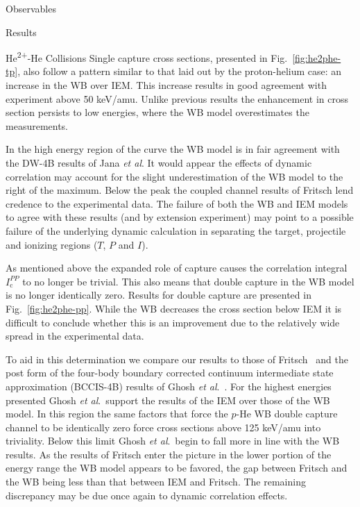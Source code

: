 \documentclass[letterpaper, 11 pt]{report}
\begin{document}
\begin{chapter}{Observables \label{chap:p-he2p-he}}
\begin{section}{Results \label{sec:phe2p-res}}
\begin{subsection}{\texorpdfstring{He\textsuperscript{2+}}{He2+}-He Collisions 
                         \label{sec:he2phe-res}}
         Single capture cross sections, presented in Fig.~\ref{fig:he2phe-tp}, also follow a pattern
         similar to that laid out by the proton-helium case: an increase in the WB over IEM. This
         increase results in good agreement with experiment above 50 keV/amu. Unlike previous results
         the enhancement in cross section persists to low energies, where the WB model overestimates the
          measurements.

         In the high energy region of the curve the WB model is in fair agreement with the DW-4B results
         of Jana \textit{et al}. It would appear the effects of dynamic correlation may account for the
         slight underestimation of the WB model to the right of the maximum. Below the peak the coupled
         channel results of Fritsch \cite{Fritsch-94} lend credence to the experimental data. The
         failure of both the WB and IEM models to agree with these results (and by extension experiment)
         may point to a possible failure of the underlying dynamic calculation in separating the target,
         projectile and ionizing regions ($T$, $P$ and $I$).

         As mentioned above the expanded role of capture causes the correlation integral
         $I^{PP}_\mathrm{c}$ to no longer be trivial. This also means that double capture in the WB
         model is no longer identically zero. Results for double capture are presented in
         Fig.~\ref{fig:he2phe-pp}. While the WB decreases the cross section below IEM it is difficult to
         conclude whether this is an improvement due to the relatively wide spread in the experimental
         data.

         To aid in this determination we compare our results to those of Fritsch~\cite{Fritsch-94} and
         the post form of the four-body boundary corrected continuum intermediate state approximation
         (BCCIS-4B) results of Ghosh \textit{et al}.~\cite{GDMP-08}. For the highest energies presented
         Ghosh \textit{et al}.\ support the results of the IEM over those of the WB model. In this
         region the same factors that force the $p$-He WB double capture channel to be identically zero
         force cross sections above 125 keV/amu into triviality. Below this limit Ghosh
         \textit{et al}.\ begin to fall more in line with the WB results. As the results of Fritsch
         enter the picture in the lower portion of the energy range the WB model appears to be favored,
         the gap between Fritsch and the WB being less than that between IEM and Fritsch. The remaining
         discrepancy may be due once again to dynamic correlation effects.

      \end{subsection}

   \end{section}

\end{chapter}
\end{document}
